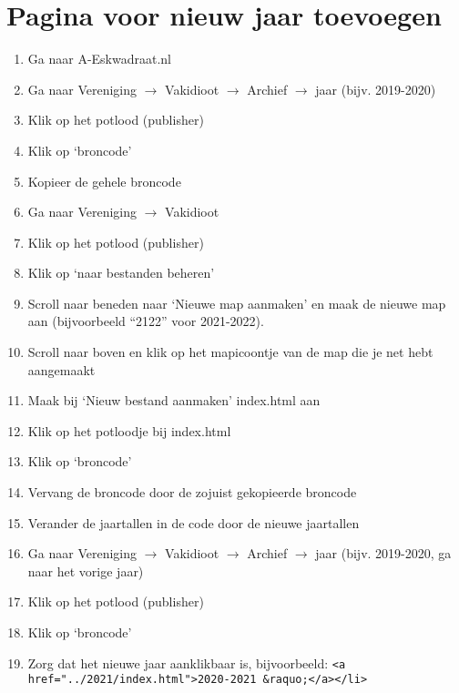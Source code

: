 \documentclass{article}
\begin{document}
\section{Pagina voor nieuw jaar toevoegen}
\begin{enumerate}
    \item Ga naar A-Eskwadraat.nl
    \item Ga naar Vereniging $\to$ Vakidioot $\to$ Archief $\to$ jaar (bijv. 2019-2020)
    \item Klik op het potlood (publisher)
    \item Klik op `broncode'
    \item Kopieer de gehele broncode
    \item Ga naar Vereniging $\to$ Vakidioot
    \item Klik op het potlood (publisher)
    \item Klik op `naar bestanden beheren'
    \item Scroll naar beneden naar `Nieuwe map aanmaken' en maak de nieuwe map aan (bijvoorbeeld ``2122'' voor 2021-2022).
    \item Scroll naar boven en klik op het mapicoontje van de map die je net hebt aangemaakt
    \item Maak bij `Nieuw bestand aanmaken' index.html aan
    \item Klik op het potloodje bij index.html
    \item Klik op `broncode'
    \item Vervang de broncode door de zojuist gekopieerde broncode
    \item Verander de jaartallen in de code door de nieuwe jaartallen
    \item Ga naar Vereniging $\to$ Vakidioot $\to$ Archief $\to$ jaar (bijv. 2019-2020, ga naar het vorige jaar)
    \item Klik op het potlood (publisher)
    \item Klik op `broncode'
    \item Zorg dat het nieuwe jaar aanklikbaar is, bijvoorbeeld: \texttt{<a href="../2021/index.html">2020-2021 \&raquo;</a></li>}
\end{enumerate}
\end{document}
